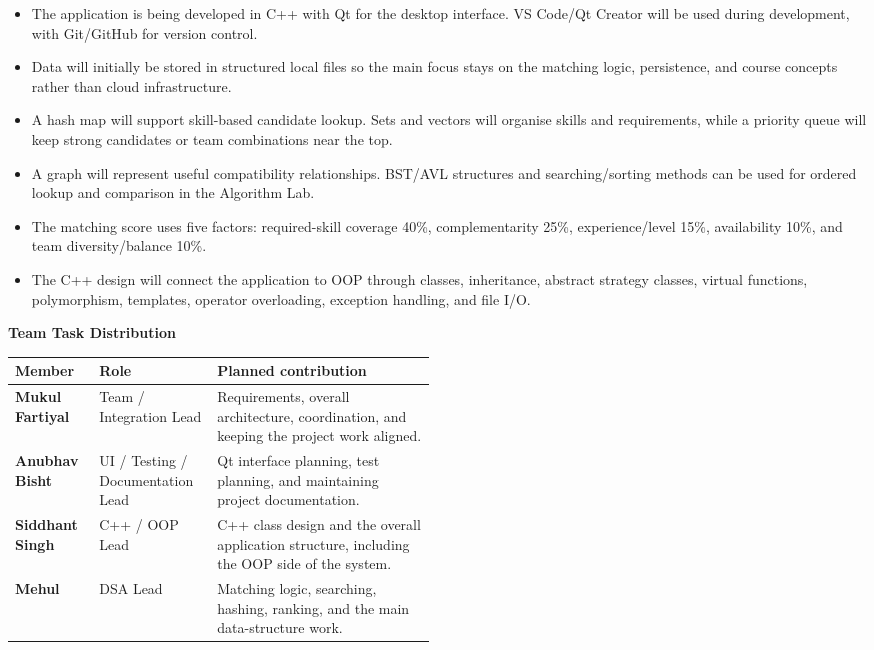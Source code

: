 \documentclass[a4paper,11pt]{article}
\newcommand{\SubHeading}[1]{\needspace{3\baselineskip}{\color{GEUBlue}\fontsize{15.5}{18}\selectfont #1\par}\vspace{1pt}}
\begin{document}
\begin{answerbox}
\begin{itemize}[leftmargin=18pt,itemsep=3pt,topsep=2pt]
\item The application is being developed in C++ with Qt for the desktop interface. VS Code/Qt Creator will be used during development, with Git/GitHub for version control.
\item Data will initially be stored in structured local files so the main focus stays on the matching logic, persistence, and course concepts rather than cloud infrastructure.
\item A hash map will support skill-based candidate lookup. Sets and vectors will organise skills and requirements, while a priority queue will keep strong candidates or team combinations near the top.
\item A graph will represent useful compatibility relationships. BST/AVL structures and searching/sorting methods can be used for ordered lookup and comparison in the Algorithm Lab.
\item The matching score uses five factors: required-skill coverage 40\%, complementarity 25\%, experience/level 15\%, availability 10\%, and team diversity/balance 10\%.
\item The C++ design will connect the application to OOP through classes, inheritance, abstract strategy classes, virtual functions, polymorphism, templates, operator overloading, exception handling, and file I/O.
\end{itemize}
\end{answerbox}
\clearpage

\SubHeading{Project Approach (continued)}
\begin{answerbox}
\textbf{Team Task Distribution}

\vspace{3pt}
\begin{tabularx}{\linewidth}{|>{\bfseries}p{0.20\linewidth}|p{0.29\linewidth}|X|}
\hline
Member & Role & Planned contribution \\
\hline
Mukul Fartiyal & Team / Integration Lead & Requirements, overall architecture, coordination, and keeping the project work aligned. \\
\hline
Anubhav Bisht & UI / Testing / Documentation Lead & Qt interface planning, test planning, and maintaining project documentation. \\
\hline
Siddhant Singh & C++ / OOP Lead & C++ class design and the overall application structure, including the OOP side of the system. \\
\hline
Mehul & DSA Lead & Matching logic, searching, hashing, ranking, and the main data-structure work. \\
\hline
\end{tabularx}
\end{answerbox}
\end{document}
